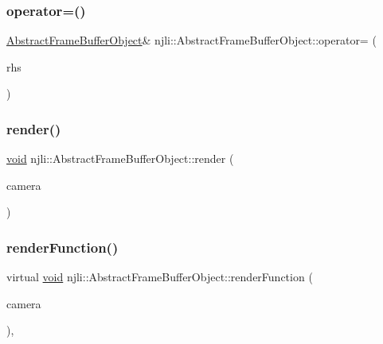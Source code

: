 \subsubsection{\texorpdfstring{operator=()}{operator=()}}
{\footnotesize\ttfamily \mbox{\hyperlink{classnjli_1_1_abstract_frame_buffer_object}{Abstract\+Frame\+Buffer\+Object}}\& njli\+::\+Abstract\+Frame\+Buffer\+Object\+::operator= (\begin{DoxyParamCaption}\item[{const \mbox{\hyperlink{classnjli_1_1_abstract_frame_buffer_object}{Abstract\+Frame\+Buffer\+Object}} \&}]{rhs }\end{DoxyParamCaption})\hspace{0.3cm}{\ttfamily [private]}}

\mbox{\label{classnjli_1_1_abstract_frame_buffer_object_ababe9973dc3593e158adf12033f66b71}} 
\subsubsection{\texorpdfstring{render()}{render()}}
{\footnotesize\ttfamily \mbox{\hyperlink{_thread_8h_af1e856da2e658414cb2456cb6f7ebc66}{void}} njli\+::\+Abstract\+Frame\+Buffer\+Object\+::render (\begin{DoxyParamCaption}\item[{\mbox{\hyperlink{classnjli_1_1_camera}{Camera}} $\ast$}]{camera }\end{DoxyParamCaption})\hspace{0.3cm}{\ttfamily [protected]}}

\mbox{\label{classnjli_1_1_abstract_frame_buffer_object_aa75a537f5745e4be8f749892d195b43c}} 
\subsubsection{\texorpdfstring{render\+Function()}{renderFunction()}}
{\footnotesize\ttfamily virtual \mbox{\hyperlink{_thread_8h_af1e856da2e658414cb2456cb6f7ebc66}{void}} njli\+::\+Abstract\+Frame\+Buffer\+Object\+::render\+Function (\begin{DoxyParamCaption}\item[{\mbox{\hyperlink{classnjli_1_1_camera}{Camera}} $\ast$}]{camera }\end{DoxyParamCaption})\hspace{0.3cm}{\ttfamily [protected]}, {}}



